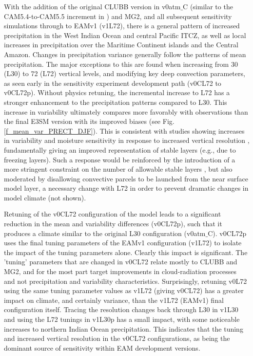 \documentclass[draft,ms]{AGUTeX}
\begin{document}
\begin{article}
With the addition of the original CLUBB version in v0atm$\_$C (similar to the CAM5.4-to-CAM5.5 increment in \cite{Bogenschutz2018}) and MG2, and all subsequent sensitivity simulations through to EAMv1 (v1L72), there is a general pattern of increased precipitation in the West Indian Ocean and central Pacific ITCZ, as well as local increases in precipitation over the Maritime Continent islands and the Central Amazon. Changes in precipitation variance generally follow the patterns of mean precipitation. The major exceptions to this are found when increasing from 30 (L30) to 72 (L72) vertical levels, and modifying key deep convection parameters, as seen early in the sensitivity experiment development path (v0CL72 to v0CL72p). Without physics retuning, the incremental increase to L72 has a stronger enhancement to the precipitation patterns compared to L30. This increase in variability ultimately compares more favorably with observations than the final E3SM version with its improved biases (see Fig. \ref{f_mean_var_PRECT_DJF}). This is consistent with studies showing increases in variability and moisture sensitivity in response to increased vertical resolution \citep{Inness2001a}, fundamentally giving an improved representation of stable layers (e.g., due to freezing layers). Such a response would be reinforced by the introduction of a more stringent constraint on the number of allowable stable layers \citep[decreased from 5 to 1,][]{Xie2018}, but also moderated by disallowing convective parcels to be launched from the near surface model layer, a necessary change with L72 in order to prevent dramatic changes in model climate (not shown). 

Retuning of the v0CL72 configuration of the model leads to a significant reduction in the mean and variability differences (v0CL72p), such that it produces a climate similar to the original L30 configuration (v0atm$\_$C). v0CL72p uses the final tuning parameters of the EAMv1 configuration (v1L72) to isolate the impact of the tuning parameters alone. Clearly this impact is significant. The 'tuning' parameters that are changed in v0CL72 \citep{Xie2018} relate mostly to CLUBB and MG2, and for the most part target improvements in cloud-radiation processes and not precipitation and variability characteristics. Surprisingly, retuning v0L72 using the same tuning parameter values as v1L72 (giving v0CL72) has a greater impact on climate, and certainly variance, than the v1L72 (EAMv1) final configuration itself. Tracing the resolution changes back through L30 in v1L30 and using the L72 tunings in v1L30p has a small impact, with some noticeable increases to northern Indian Ocean precipitation. This indicates that the tuning and increased vertical resolution in the v0CL72 configurations, as being the dominant source of sensitivity within EAM development versions.


\end{article}
\end{document}
